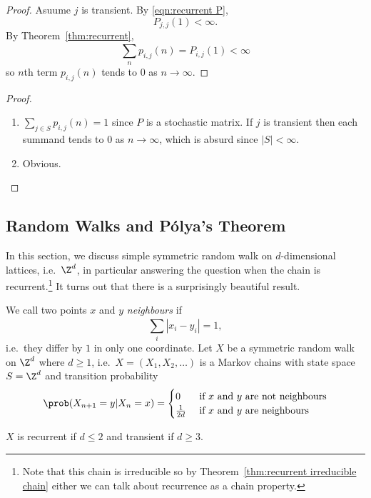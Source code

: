 \documentclass[a4paper]{article}
\begin{document}
  \begin{proof}
    Asuume \(j\) is transient. By \eqref{eqn:recurrent P},
    \[
      P_{j,j}(1) < \infty.
    \]
    By Theorem~\ref{thm:recurrent},
    \[
      \sum_{n}^{ }p_{i,j}(n) = P_{i,j}(1) < \infty
    \]
    so \(n\)th term \(p_{i,j}(n)\) tends to \(0\) as \(n\to \infty\).
  \end{proof}

\begin{proof}\leavevmode
  \begin{enumerate}
  \item \(\sum_{j\in S}^{ }p_{i,j}(n) = 1 \) since \(P\) is a stochastic matrix. If \(j\) is transient then each summand tends to \(0\) as \(n\to \infty\), which is absurd since \(|S| < \infty\).
  \item Obvious.
  \end{enumerate}
\end{proof}

\subsection{Random Walks and Pólya's Theorem}

In this section, we discuss simple symmetric random walk on \(d\)-dimensional lattices, i.e.\ \(\Z^d\), in particular answering the question when the chain is recurrent.\footnote{Note that this chain is irreducible so by Theorem~\ref{thm:recurrent irreducible chain} either we can talk about recurrence as a chain property.}  It turns out that there is a surprisingly beautiful result.

We call two points \(x\) and \(y\) \emph{neighbours} if
\[
  \sum_{i}^{ }|x_i-y_i| = 1,
\]
i.e.\ they differ by \(1\) in only one coordinate. Let \(X\) be a symmetric random walk on \(\Z^d\) where \(d \geq 1\), i.e.\ \(X = (X_1, X_2, \dots)\) is a Markov chains with state space \(S = \Z^d\) and transition probability
\[
  \prob(X_{n+1} = y | X_n = x) =
  \begin{cases}
    0 & \text{ if } x \text{ and } y \text{ are not neighbours} \\
    \frac{1}{2d} & \text{ if } x \text{ and } y \text{ are neighbours}
  \end{cases}
\]

\begin{theorem}[Pólya's]
  \(X\) is recurrent if \(d \leq 2\) and transient if \(d \geq 3\).
\end{theorem}
\end{document}
